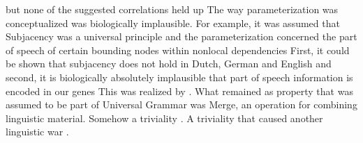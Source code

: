 \iftoggle{long}{\parencites{Rizzi86a}[\page 8]{Chomsky2000a-u},}{
\parencites[\page 8]{Chomsky2000a-u},}
 but none of the suggested correlations held 
up 
\iftoggle{long}{%
\parencites{Haider94c-u}[Section~2.2]{Haider2001a}[Section~16.1]{MuellerGT-Eng5}.}{%
(\citealt[Section~2.2]{Haider2001a}; see \citealt[Section~16.1]{MuellerGT-Eng5} for an overview).}
The way
parameterization was conceptualized was biologically implausible. For example, it was assumed that
Subjacency was a universal principle and the parameterization concerned the part of speech of
certain bounding nodes within nonlocal dependencies 
\iftoggle{long}{\parencites[\page 271]{Chomsky73a}[\page 40]{Chomsky86b}{Baltin81a,Baltin2006a}.}{
\parencites[\page 40]{Chomsky86b}{Baltin81a}.}
First, it could be shown that subjacency does not hold in
Dutch, German and English \parencites[]{Koster78b-u}[]{Mueller99a}{Mueller2004d}[Section~3]{Mueller2007c}{SS2013b-u} and second, it is biologically
absolutely implausible that part of speech information is encoded in our genes
\iftoggle{long}{\parencites{Bishop2002a}[Section~6.4.2.2]{Dabrowska2004a}{FM2005a}.}{%
\parencites{Bishop2002a}[Section~6.4.2.2]{FM2005a}.}
This was realized by
\citet*{HCF2002a}. What remained as property that was assumed to be part of Universal Grammar was
Merge, an operation for combining linguistic material. Somehow a triviality
\citep[475]{MuellerGT-Eng5}. A triviality that caused another linguistic war \citep{Pullum2024a}. 
 
